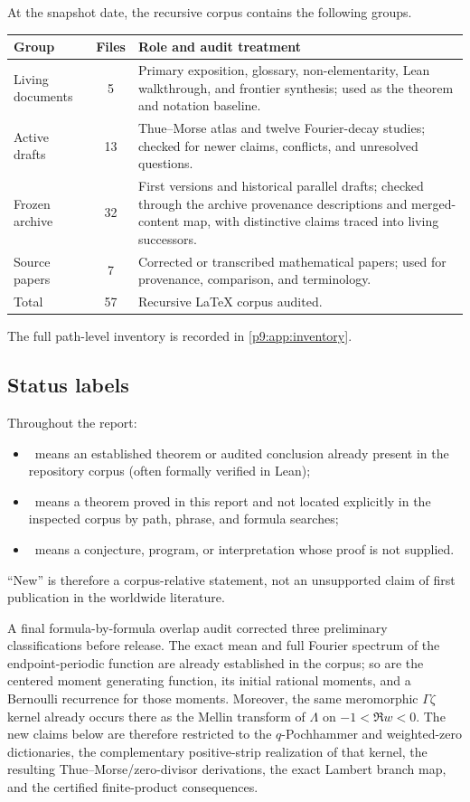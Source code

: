 \documentclass[11pt]{article}
\numberwithin{equation}{section}
\theoremstyle{definition}
\theoremstyle{remark}
\begin{document}
At the snapshot date, the recursive corpus contains the following groups.
\begin{center}
\small
\begin{tabularx}{\textwidth}{@{}l c >{\raggedright\arraybackslash}X@{}}
\toprule
Group & Files & Role and audit treatment\\
\midrule
Living documents & 5 & Primary exposition, glossary, non-elementarity, Lean walkthrough,
and frontier synthesis; used as the theorem and notation baseline.\\
Active drafts & 13 & Thue--Morse atlas and twelve Fourier-decay studies; checked for
newer claims, conflicts, and unresolved questions.\\
Frozen archive & 32 & First versions and historical parallel drafts; checked through the
archive provenance descriptions and merged-content map, with distinctive claims traced into
living successors.\\
Source papers & 7 & Corrected or transcribed mathematical papers; used for provenance,
comparison, and terminology.\\
\midrule
Total & 57 & Recursive LaTeX corpus audited.\\
\bottomrule
\end{tabularx}
\end{center}
The full path-level inventory is recorded in \cref{p9:app:inventory}.

\subsection{Status labels}
Throughout the report:
\begin{itemize}
\item \statusE\ means an established theorem or audited conclusion already present in the
repository corpus (often formally verified in Lean);
\item \statusN\ means a theorem proved in this report and not located explicitly in the
inspected corpus by path, phrase, and formula searches;
\item \statusC\ means a conjecture, program, or interpretation whose proof is not supplied.
\end{itemize}
``New'' is therefore a corpus-relative statement, not an unsupported claim of first
publication in the worldwide literature.

A final formula-by-formula overlap audit corrected three preliminary classifications before
release.  The exact mean and full Fourier spectrum of the endpoint-periodic function are
already established in the corpus; so are the centered moment generating function, its
initial rational moments, and a Bernoulli recurrence for those moments.  Moreover, the
same meromorphic $\Gamma\zeta$ kernel already occurs there as the Mellin transform of
$\Lambda$ on $-1<\Re w<0$.  The new claims below are therefore restricted to the
$q$-Pochhammer and weighted-zero dictionaries, the complementary positive-strip
realization of that kernel, the resulting Thue--Morse/zero-divisor derivations, the exact
Lambert branch map, and the certified finite-product consequences.
\end{document}
